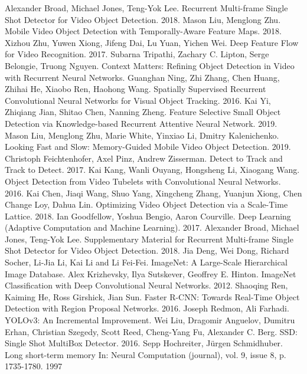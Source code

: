 \documentclass[conference]{IEEEtran}
\begin{document}
\begin{thebibliography}{00}
 Alexander Broad, Michael Jones, Teng-Yok Lee. Recurrent Multi-frame Single Shot Detector for Video Object Detection. 2018.
 Mason Liu, Menglong Zhu. Mobile Video Object Detection with Temporally-Aware Feature Maps. 2018.
 Xizhou Zhu, Yuwen Xiong, Jifeng Dai, Lu Yuan, Yichen Wei. Deep Feature Flow for Video Recognition. 2017.
 Subarna Tripathi, Zachary C. Lipton, Serge Belongie, Truong Nguyen. Context Matters: Refining Object Detection in Video with Recurrent Neural Networks.
 Guanghan Ning, Zhi Zhang, Chen Huang, Zhihai He, Xiaobo Ren, Haohong Wang. Spatially Supervised Recurrent Convolutional Neural Networks for Visual Object Tracking. 2016.
 Kai Yi, Zhiqiang Jian, Shitao Chen, Nanning Zheng. Feature Selective Small Object Detection via Knowledge-based Recurrent Attentive Neural Network. 2019.
 Mason Liu, Menglong Zhu, Marie White, Yinxiao Li, Dmitry Kalenichenko. Looking Fast and Slow: Memory-Guided Mobile Video Object Detection. 2019.
 Christoph Feichtenhofer, Axel Pinz, Andrew Zisserman. Detect to Track and Track to Detect. 2017.
 Kai Kang, Wanli Ouyang, Hongsheng Li, Xiaogang Wang. Object Detection from Video Tubelets with Convolutional Neural Networks. 2016.
 Kai Chen, Jiaqi Wang, Shuo Yang, Xingcheng Zhang, Yuanjun Xiong, Chen Change Loy, Dahua Lin. Optimizing Video Object Detection via a Scale-Time Lattice. 2018.
 Ian Goodfellow, Yoshua Bengio, Aaron Courville. Deep Learning (Adaptive Computation and Machine Learning). 2017.
 Alexander Broad, Michael Jones, Teng-Yok Lee. Supplementary Material for Recurrent Multi-frame Single Shot Detector for Video Object Detection. 2018.
 Jia Deng, Wei Dong, Richard Socher, Li-Jia Li, Kai Li and Li Fei-Fei. ImageNet: A Large-Scale Hierarchical Image Database. 
 Alex Krizhevsky, Ilya Sutskever, Geoffrey E. Hinton. ImageNet Classification with Deep Convolutional Neural Networks. 2012.
 Shaoqing Ren, Kaiming He, Ross Girshick, Jian Sun. Faster R-CNN: Towards Real-Time Object Detection with Region Proposal Networks. 2016. 
 Joseph Redmon, Ali Farhadi. YOLOv3: An Incremental Improvement.
 Wei Liu, Dragomir Anguelov, Dumitru Erhan, Christian Szegedy, Scott Reed, Cheng-Yang Fu, Alexander C. Berg. SSD: Single Shot MultiBox Detector. 2016.
 Sepp Hochreiter, Jürgen Schmidhuber. Long short-term memory In: Neural Computation (journal), vol. 9, issue 8, p. 1735-1780. 1997 
\end{thebibliography}
\vspace{12pt}
\end{document}
